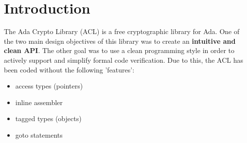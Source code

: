 \chapter{Introduction}
The Ada Crypto Library (ACL) is a free cryptographic library for Ada.
One of the two main design objectives of this library was to create
an \textbf{intuitive and clean API}. The other goal was to use a clean
programming style in order to actively support and simplify formal code
verification. Due to this, the ACL has been coded without the
following 'features':
\begin{itemize}
\item access types (pointers)
\item inline assembler
\item tagged types (objects)
\item goto statements
\end{itemize}

